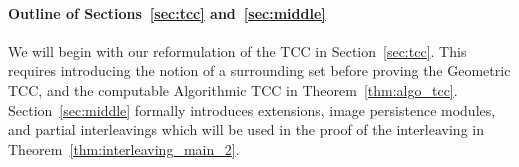 \paragraph{Outline of Sections~\ref{sec:tcc} and~\ref{sec:middle}}

We will begin with our reformulation of the TCC in Section~\ref{sec:tcc}.
This requires introducing the notion of a surrounding set before proving the Geometric TCC, and the computable Algorithmic TCC in Theorem~\ref{thm:algo_tcc}.
Section~\ref{sec:middle} formally introduces extensions, image persistence modules, and partial interleavings which will be used in the proof of the interleaving in Theorem~\ref{thm:interleaving_main_2}.

%
%
%
